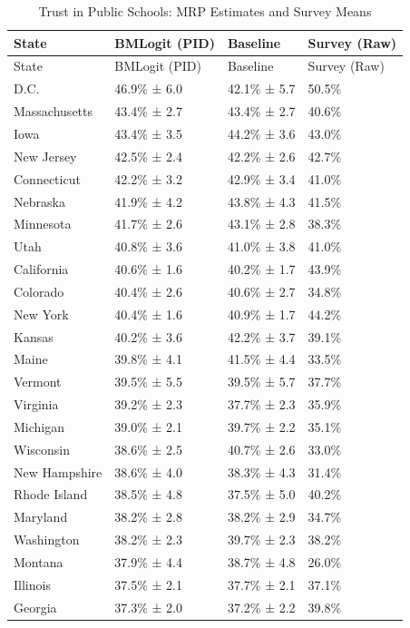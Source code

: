 \documentclass[
  letterpaper,
  DIV=11,
  numbers=noendperiod]{scrartcl}
\begin{document}
\begin{longtable}[]{@{}llll@{}}
\caption{Trust in Public Schools: MRP Estimates and Survey
Means}\tabularnewline
\toprule\noalign{}
State & BMLogit (PID) & Baseline & Survey (Raw) \\
\midrule\noalign{}
\endfirsthead
\toprule\noalign{}
State & BMLogit (PID) & Baseline & Survey (Raw) \\
\midrule\noalign{}
\endhead
\bottomrule\noalign{}
\endlastfoot
D.C. & 46.9\% ± 6.0 & 42.1\% ± 5.7 & 50.5\% \\
Massachusetts & 43.4\% ± 2.7 & 43.4\% ± 2.7 & 40.6\% \\
Iowa & 43.4\% ± 3.5 & 44.2\% ± 3.6 & 43.0\% \\
New Jersey & 42.5\% ± 2.4 & 42.2\% ± 2.6 & 42.7\% \\
Connecticut & 42.2\% ± 3.2 & 42.9\% ± 3.4 & 41.0\% \\
Nebraska & 41.9\% ± 4.2 & 43.8\% ± 4.3 & 41.5\% \\
Minnesota & 41.7\% ± 2.6 & 43.1\% ± 2.8 & 38.3\% \\
Utah & 40.8\% ± 3.6 & 41.0\% ± 3.8 & 41.0\% \\
California & 40.6\% ± 1.6 & 40.2\% ± 1.7 & 43.9\% \\
Colorado & 40.4\% ± 2.6 & 40.6\% ± 2.7 & 34.8\% \\
New York & 40.4\% ± 1.6 & 40.9\% ± 1.7 & 44.2\% \\
Kansas & 40.2\% ± 3.6 & 42.2\% ± 3.7 & 39.1\% \\
Maine & 39.8\% ± 4.1 & 41.5\% ± 4.4 & 33.5\% \\
Vermont & 39.5\% ± 5.5 & 39.5\% ± 5.7 & 37.7\% \\
Virginia & 39.2\% ± 2.3 & 37.7\% ± 2.3 & 35.9\% \\
Michigan & 39.0\% ± 2.1 & 39.7\% ± 2.2 & 35.1\% \\
Wisconsin & 38.6\% ± 2.5 & 40.7\% ± 2.6 & 33.0\% \\
New Hampshire & 38.6\% ± 4.0 & 38.3\% ± 4.3 & 31.4\% \\
Rhode Island & 38.5\% ± 4.8 & 37.5\% ± 5.0 & 40.2\% \\
Maryland & 38.2\% ± 2.8 & 38.2\% ± 2.9 & 34.7\% \\
Washington & 38.2\% ± 2.3 & 39.7\% ± 2.3 & 38.2\% \\
Montana & 37.9\% ± 4.4 & 38.7\% ± 4.8 & 26.0\% \\
Illinois & 37.5\% ± 2.1 & 37.7\% ± 2.1 & 37.1\% \\
Georgia & 37.3\% ± 2.0 & 37.2\% ± 2.2 & 39.8\% \\

\end{longtable}
\end{document}
